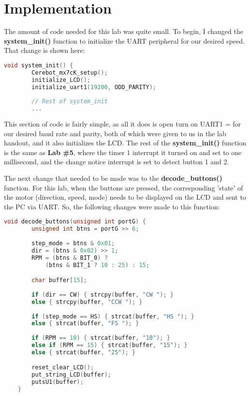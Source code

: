 \documentclass[a4paper, 12pt]{article}
\begin{document}
\newpage
\section{Implementation}
The amount of code needed for this lab was quite small. To begin, I changed the \textbf{system\_init()} function to initialize the UART peripheral for our desired speed. That change is shown here:

	\begin{mdframed}[backgroundcolor=code-gray, roundcorner=10pt,
								innerleftmargin=5, innertopmargin=5, innerbottommargin=5]	
	\begin{lstlisting}[language=C, caption=System Initialization Function, tabsize=2]
	void system_init() {
		Cerebot_mx7cK_setup();
		initialize_LCD();
		initialize_uart1(19200, ODD_PARITY);
		
		// Rest of system_init
		...
	\end{lstlisting}
	\end{mdframed}
	
This section of code is fairly simple, as all it does is open turn on UART1 = for our desired baud rate and parity, both of which were given to us in the lab handout, and it also initializes the LCD. The rest of the \textbf{system\_init()} function is the same as \textbf{Lab \#5}, where the timer 1 interrupt it turned on and set to one millisecond, and the change notice interrupt is set to detect button 1 and 2.

The next change that needed to be made was to the \textbf{decode\_buttons()} function. For this lab, when the buttons are pressed, the corresponding 'state' of the motor (direction, speed, mode) needs to be displayed on the LCD and sent to the PC via UART. So, the following changes were made to this function:

	\begin{mdframed}[backgroundcolor=code-gray, roundcorner=10pt,
								innerleftmargin=5, innertopmargin=5, innerbottommargin=5]	
	\begin{lstlisting}[language=C, caption=Changed Button Decoding, tabsize=2]
	void decode_buttons(unsigned int portG) {
		unsigned int btns = portG >> 6;	
	
		step_mode = btns & 0x01;
		dir = (btns & 0x02) >> 1;
		RPM = (btns & BIT_0) ?
			(btns & BIT_1 ? 10 : 25) : 15;

		char buffer[15];	
	
		if (dir == CW) { strcpy(buffer, "CW "); }
		else { strcpy(buffer, "CCW "); }
	
		if (step_mode == HS) { strcat(buffer, "HS "); }
		else { strcat(buffer, "FS "); }
	
		if (RPM == 10) { strcat(buffer, "10"); }
		else if (RPM == 15) { strcat(buffer, "15"); }
		else { strcat(buffer, "25"); }

		reset_clear_LCD();	
		put_string_LCD(buffer);	
		putsU1(buffer);
	}
	\end{lstlisting}
	\end{mdframed}
	
\end{document}
